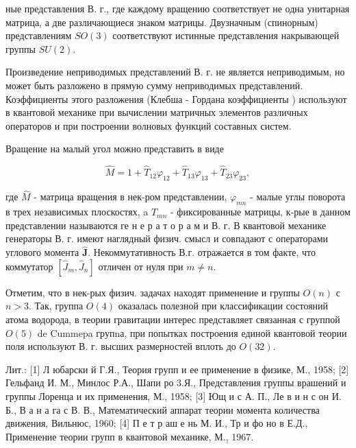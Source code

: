 \documentclass[10pt]{article}
\begin{document}
ные представления В. г., где каждому вращению соответствует не одна унитарная матрица, а две различающиеся знаком матрицы. Двузначным (спинорным) представлениям $S O(3)$ соответствуют истинные представления накрывающей группы $S U(2)$.



Произведение неприводимых представлений В. г. не является неприводимым, но может быть разложено в прямую сумму неприводимых представлений. Коэффициенты этого разложения (Клебша - Гордана коэффициенты ) используют в квантовой механике при вычислении матричных элементов различных операторов и при построении волновых функций составных систем.



Вращение на малый угол можно представить в виде



\[

\hat{M}=1+\hat{T}_{12} \varphi_{12}+\hat{T}_{13} \varphi_{13}+\hat{T}_{23} \varphi_{23},

\]



где $\hat{M}$ - матрица вращения в нек-ром представлении, $\varphi_{m n}$ - малые углы поворота в трех независимых плоскостях, a $\hat{T}_{m n}$ - фиксированные матрицы, к-рые в данном представлении называются ге н е р а т о р а м и В. г. В квантовой механике генераторы В. г. имеют наглядный физич. смысл и совпадают с операторами углового момента $\hat{\boldsymbol{J}}$. Некоммутативность В.г. отражается в том факте, что коммутатор $\left[\hat{J}_{m}, \hat{J}_{n}\right]$ отличен от нуля при $m \neq n$.



Отметим, что в нек-рых физич. задачах находят применение и группы $O(n)$ с $n>3$. Так, группа $O(4)$ оказалась полезной при классификации состояний атома водорода, в теории гравитации интерес представляет связанная с группой $O(5)$ de Cummepa групnа, при попытках построения единой квантовой теории поля используют В. г. высших размерностей вплоть до $O(32)$.



Лит.: [1] Л юбарски й Г.Я., Теория групп и ее применение в физике, М., 1958; [2] Гельфанд И. М., Минлос Р.А., Шапи ро 3.Я., Представления группы врашений и группы Лоренца и их применения, М., 1958; [3] Ющ и с А. П., Ле в и н с он И. Б., В а н а га с В. В., Математический аппарат теории момента количества движения, Вильнюс, 1960; [4] П е т р аш е нь М. И., Тр и фо но в Е.Д., Применение теории групп в квантовой механике, М., 1967.
\end{document}
